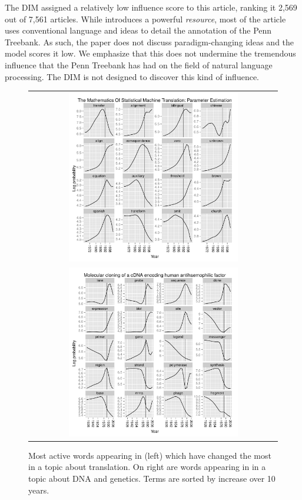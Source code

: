 The DIM assigned a relatively low influence score to this article,
ranking it 2,569 out of 7,561 articles.  While \cite{marcus:1993}  %
introduces a powerful \emph{resource}, most of the article uses
conventional language and ideas to detail the annotation of the Penn
Treebank.  As such, the paper does not discuss paradigm-changing ideas
and the model scores it low.  We emphasize that this does not
undermine the tremendous influence that the Penn Treebank has had on
the field of natural language processing.  The DIM is not designed to
discover this kind of influence.

\begin{figure}
\normalsize
\begin{tabular}{c}
\includegraphics[width=0.7\textwidth]{chapter_influence/figures/acl_brown.pdf}
\\
\includegraphics[width=0.7\textwidth]{chapter_influence/figures/nature_cloning.pdf} \\
\end{tabular}
  \small
\caption{Most active words appearing in \cite{brown:1993} (left) which
  have changed the most in a topic about translation. On right are
  words appearing in \cite{toole:1984} in a topic about DNA and
  genetics.  Terms are sorted by increase over 10 years.}  \normalsize
\label{fig:words}
\end{figure}


